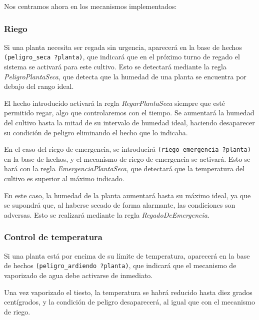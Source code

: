 \documentclass[11pt,a4paper]{article}
\begin{document}
Nos centramos ahora en los mecanismos implementados:

\subsubsection*{Riego}
Si una planta necesita ser regada sin urgencia, aparecerá en la base de hechos \texttt{(peligro\_seca ?planta)}, que indicará que en el próximo turno de regado el sistema se activará para este cultivo. Esto se detectará mediante la regla \textit{PeligroPlantaSeca}, que detecta que la humedad de una planta se encuentra por debajo del rango ideal.

El hecho introducido activará la regla \textit{RegarPlantaSeca} siempre que esté permitido regar, algo que controlaremos con el tiempo. Se aumentará la humedad del cultivo hasta la mitad de su intervalo de humedad ideal, haciendo desaparecer su condición de peligro eliminando el hecho que lo indicaba.


\medskip

En el caso del riego de emergencia, se introducirá \texttt{(riego\_emergencia ?planta)} en la base de hechos, y el mecanismo de riego de emergencia se activará. Esto se hará con la regla \textit{EmergenciaPlantaSeca}, que detectará que la temperatura del cultivo es superior al máximo indicado.

En este caso, la humedad de la planta aumentará hasta su máximo ideal, ya que se supondrá que, al haberse secado de forma alarmante, las condiciones son adversas. Esto se realizará mediante la regla \textit{RegadoDeEmergencia}.

\subsubsection*{Control de temperatura}
Si una planta está por encima de su límite de temperatura, aparecerá en la base de hechos \texttt{(peligro\_ardiendo ?planta)}, que indicará que el mecanismo de vaporizado de agua debe activarse de inmediato.

Una vez vaporizado el tiesto, la temperatura se habrá reducido hasta diez grados centígrados, y la condición de peligro desaparecerá, al igual que con el mecanismo de riego.
\end{document}
